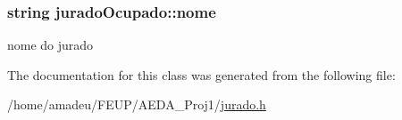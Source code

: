 \subsubsection[{\texorpdfstring{nome}{nome}}]{\setlength{\rightskip}{0pt plus 5cm}string jurado\+Ocupado\+::nome}\hypertarget{classjuradoOcupado_a38fa76168b435d63e7eb6294a644793e}{}\label{classjuradoOcupado_a38fa76168b435d63e7eb6294a644793e}


nome do jurado 



The documentation for this class was generated from the following file\+:\begin{DoxyCompactItemize}
\item 
/home/amadeu/\+F\+E\+U\+P/\+A\+E\+D\+A\+\_\+\+Proj1/\hyperlink{jurado_8h}{jurado.\+h}\end{DoxyCompactItemize}
